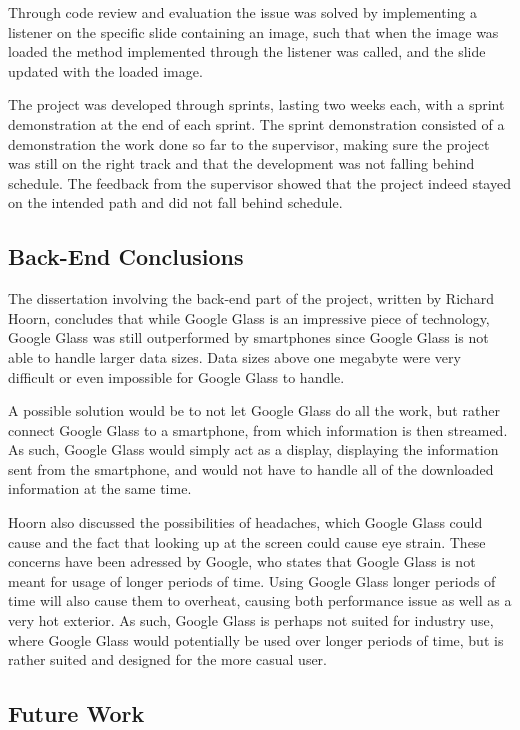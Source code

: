 Through code review and evaluation the issue was solved by implementing a listener on the specific slide containing an image, such that when the image was loaded the method implemented through the listener was called, and the slide updated with the loaded image.

The project was developed through sprints, lasting two weeks each, with a sprint demonstration at the end of each sprint. The sprint demonstration consisted of a demonstration the work done so far to the supervisor, making sure the project was still on the right track and that the development was not falling behind schedule. The feedback from the supervisor showed that the project indeed stayed on the intended path and did not fall behind schedule.

\subsection{Back-End Conclusions}
The dissertation involving the back-end part of the project, written by Richard Hoorn, concludes that while Google Glass is an impressive piece of technology, Google Glass was still outperformed by smartphones since Google Glass is not able to handle larger data sizes. Data sizes above one megabyte were very difficult or even impossible for Google Glass to handle.

A possible solution would be to not let Google Glass do all the work, but rather connect Google Glass to a smartphone, from which information is then streamed. As such, Google Glass would simply act as a display, displaying the information sent from the smartphone, and would not have to handle all of the downloaded information at the same time.

Hoorn also discussed the possibilities of headaches, which Google Glass could cause and the fact that looking up at the screen could cause eye strain. These concerns have been adressed by Google, who states that Google Glass is not meant for usage of longer periods of time. Using Google Glass longer periods of time will also cause them to overheat, causing both performance issue as well as a very hot exterior. As such, Google Glass is perhaps not suited for industry use, where Google Glass would potentially be used over longer periods of time, but is rather suited and designed for the more casual user.

\subsection{Future Work}
\label{subsec:futurework}


